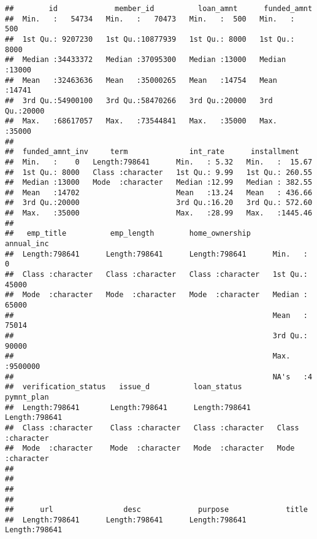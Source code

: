 \documentclass[
]{article}
\begin{document}
\begin{verbatim}
##        id             member_id          loan_amnt      funded_amnt   
##  Min.   :   54734   Min.   :   70473   Min.   :  500   Min.   :  500  
##  1st Qu.: 9207230   1st Qu.:10877939   1st Qu.: 8000   1st Qu.: 8000  
##  Median :34433372   Median :37095300   Median :13000   Median :13000  
##  Mean   :32463636   Mean   :35000265   Mean   :14754   Mean   :14741  
##  3rd Qu.:54900100   3rd Qu.:58470266   3rd Qu.:20000   3rd Qu.:20000  
##  Max.   :68617057   Max.   :73544841   Max.   :35000   Max.   :35000  
##                                                                       
##  funded_amnt_inv     term              int_rate      installment     
##  Min.   :    0   Length:798641      Min.   : 5.32   Min.   :  15.67  
##  1st Qu.: 8000   Class :character   1st Qu.: 9.99   1st Qu.: 260.55  
##  Median :13000   Mode  :character   Median :12.99   Median : 382.55  
##  Mean   :14702                      Mean   :13.24   Mean   : 436.66  
##  3rd Qu.:20000                      3rd Qu.:16.20   3rd Qu.: 572.60  
##  Max.   :35000                      Max.   :28.99   Max.   :1445.46  
##                                                                      
##   emp_title          emp_length        home_ownership       annual_inc     
##  Length:798641      Length:798641      Length:798641      Min.   :      0  
##  Class :character   Class :character   Class :character   1st Qu.:  45000  
##  Mode  :character   Mode  :character   Mode  :character   Median :  65000  
##                                                           Mean   :  75014  
##                                                           3rd Qu.:  90000  
##                                                           Max.   :9500000  
##                                                           NA's   :4        
##  verification_status   issue_d          loan_status         pymnt_plan       
##  Length:798641       Length:798641      Length:798641      Length:798641     
##  Class :character    Class :character   Class :character   Class :character  
##  Mode  :character    Mode  :character   Mode  :character   Mode  :character  
##                                                                              
##                                                                              
##                                                                              
##                                                                              
##      url                desc             purpose             title          
##  Length:798641      Length:798641      Length:798641      Length:798641     

\end{verbatim}
\end{document}
